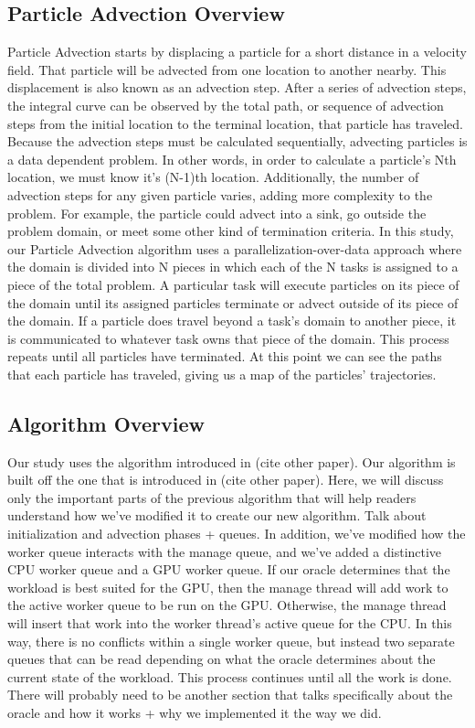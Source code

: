 \documentclass{IEEEtran}
\begin{document}
\subsection{Particle Advection Overview}
Particle Advection starts by displacing a particle for a short distance in a velocity field.
%
That particle will be advected from one location to another nearby.
%
This displacement is also known as an advection step.
%
After a series of advection steps, the integral curve can be observed by the total path, or sequence of advection steps from the initial location to the terminal location, that particle has traveled.
%
Because the advection steps must be calculated sequentially, advecting particles is a data dependent problem.
%
In other words, in order to calculate a particle's Nth location, we must know it's (N-1)th location.
%
Additionally, the number of advection steps for any given particle varies, adding more complexity to the problem.
%
For example, the particle could advect into a sink, go outside the problem domain, or meet some other kind of termination criteria.
%
In this study, our Particle Advection algorithm uses a parallelization-over-data approach where the domain is divided into N pieces in which each of the N tasks is assigned to a piece of the total problem.
%
A particular task will execute particles on its piece of the domain until its assigned particles terminate or advect outside of its piece of the domain.
%
If a particle does travel beyond a task's domain to another piece, it is communicated to whatever task owns that piece of the domain.
%
This process repeats until all particles have terminated.
%
At this point we can see the paths that each particle has traveled, giving us a map of the particles' trajectories.
%
\subsection{Algorithm Overview}
Our study uses the algorithm introduced in (cite other paper).
%
Our algorithm is built off the one that is introduced in (cite other paper).
%
Here, we will discuss only the important parts of the previous algorithm that will help readers understand how we've modified it to create our new algorithm.
%
Talk about initialization and advection phases + queues.
%
In addition, we've modified how the worker queue interacts with the manage queue, and we've added a distinctive CPU worker queue and a GPU worker queue. 
%
If our oracle determines that the workload is best suited for the GPU, then the manage thread will add work to the active worker queue to be run on the GPU.
%
Otherwise, the manage thread will insert that work into the worker thread's active queue for the CPU.
%
In this way, there is no conflicts within a single worker queue, but instead two separate queues that can be read depending on what the oracle determines about the current state of the workload.
%
This process continues until all the work is done.
%
There will probably need to be another section that talks specifically about the oracle and how it works + why we implemented it the way we did.
%
\end{document}
